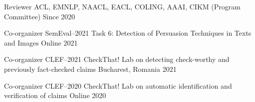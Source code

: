 
\begin{cvhonors}

  \cvhonor
    {Reviewer}
    {ACL, EMNLP, NAACL, EACL, COLING, AAAI, CIKM (Program Committee)}
    {}
    {Since 2020}

  \cvhonor
    {Co-organizer}
    {SemEval--2021 Task 6: Detection of Persuasion Techniques in Texts and Images}
    {Online}
    {2021}

  \cvhonor
    {Co-organizer}
    {CLEF--2021 CheckThat! Lab on detecting check-worthy and previously fact-checked claims}
    {Bucharest, Romania}
    {2021}

  \cvhonor
    {Co-organizer}
    {CLEF--2020 CheckThat! Lab on automatic identification and verification of claims}
    {Online}
    {2020}

\end{cvhonors}

